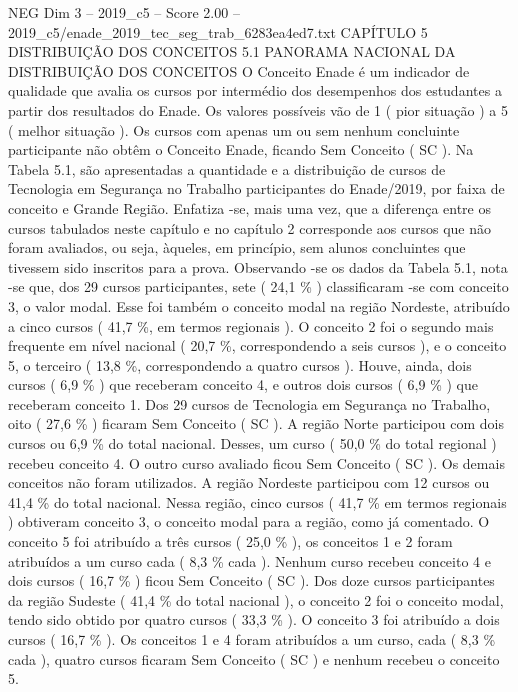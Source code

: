 \begin{textsample}{NEG Dim 3 – 2019\_c5 – Score 2.00 – 2019\_c5/enade\_2019\_tec\_seg\_trab\_6283ea4ed7.txt}  \label{ex:f3_neg_189}
CAPÍTULO 5 DISTRIBUIÇÃO DOS CONCEITOS 5.1 PANORAMA NACIONAL DA DISTRIBUIÇÃO DOS CONCEITOS O Conceito Enade é um indicador de qualidade que avalia os cursos por intermédio dos desempenhos dos estudantes a partir dos resultados do Enade.
Os valores possíveis vão de 1 ( pior situação ) a 5 ( melhor situação ).
Os cursos com apenas um ou sem nenhum concluinte participante não obtêm o Conceito Enade, ficando Sem Conceito ( SC ).
Na Tabela 5.1, são apresentadas a quantidade e a distribuição de cursos de Tecnologia em Segurança no Trabalho participantes do Enade/2019, por faixa de conceito e Grande Região.
Enfatiza -se, mais uma vez, que a diferença entre os cursos tabulados neste capítulo e no capítulo 2 corresponde aos cursos que não foram avaliados, ou seja, àqueles, em princípio, sem alunos concluintes que tivessem sido inscritos para a prova.
Observando -se os dados da Tabela 5.1, nota -se que, dos 29 cursos participantes, sete ( 24,1 \% ) classificaram -se com conceito 3, o valor modal.
Esse foi também o conceito modal na região Nordeste, atribuído a cinco cursos ( 41,7 \%, em termos regionais ).
O conceito 2 foi o segundo mais frequente em nível nacional ( 20,7 \%, correspondendo a seis cursos ), e o conceito 5, o terceiro ( 13,8 \%, correspondendo a quatro cursos ).
Houve, ainda, dois cursos ( 6,9 \% ) que receberam conceito 4, e outros dois cursos ( 6,9 \% ) que receberam conceito 1.
Dos 29 cursos de Tecnologia em Segurança no Trabalho, oito ( 27,6 \% ) ficaram Sem Conceito ( SC ).
A região Norte participou com dois cursos ou 6,9 \% do total nacional.
Desses, um curso ( 50,0 \% do total regional ) recebeu conceito 4.
O outro curso avaliado ficou Sem Conceito ( SC ).
Os demais conceitos não foram utilizados.
A região Nordeste participou com 12 cursos ou 41,4 \% do total nacional.
Nessa região, cinco cursos ( 41,7 \% em termos regionais ) obtiveram conceito 3, o conceito modal para a região, como já comentado.
O conceito 5 foi atribuído a três cursos ( 25,0 \% ), os conceitos 1 e 2 foram atribuídos a um curso cada ( 8,3 \% cada ).
Nenhum curso recebeu conceito 4 e dois cursos ( 16,7 \% ) ficou Sem Conceito ( SC ).
Dos doze cursos participantes da região Sudeste ( 41,4 \% do total nacional ), o conceito 2 foi o conceito modal, tendo sido obtido por quatro cursos ( 33,3 \% ).
O conceito 3 foi atribuído a dois cursos ( 16,7 \% ).
Os conceitos 1 e 4 foram atribuídos a um curso, cada ( 8,3 \% cada ), quatro cursos ficaram Sem Conceito ( SC ) e nenhum recebeu o conceito 5.

\end{textsample}
